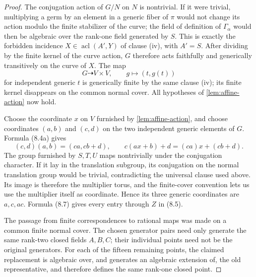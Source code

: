 \documentclass[11pt,oneside]{article}
\theoremstyle{definition}
\theoremstyle{remark}
\newcommand{\acl}{\operatorname{acl}}
\begin{document}
\begin{proof}
The conjugation action of $G/N$ on $N$ is nontrivial.  If it were trivial, multiplying a
germ by an element in a generic fiber of $\pi$ would not change its action modulo the
finite stabilizer of the curve; the field of definition of $\Gamma_\alpha$ would then be
algebraic over the rank-one field generated by $S$.  This is exactly the forbidden
incidence $X\in\acl(A',Y)$ of clause (iv), with $A'=S$.  After dividing by the finite
kernel of the curve action, $G$ therefore acts faithfully and generically transitively on
the curve of $X$.  The map
\[
 G\dashrightarrow V\times V,\qquad g\longmapsto(t,g(t))
\]
for independent generic $t$ is generically finite by the same clause (iv); its finite
kernel disappears on the common normal cover.  All hypotheses of
\cref{lem:affine-action} now hold.

Choose the coordinate $x$ on $V$ furnished by \cref{lem:affine-action}, and choose
coordinates $(a,b)$ and $(c,d)$ on the two independent generic elements of $G$.  Formula
(8.4a) gives
\[
 (c,d)(a,b)=(ca,cb+d),\qquad c(ax+b)+d=(ca)x+(cb+d).             \tag{8.7}
\]
The group furnished by $S,T,U$ maps nontrivially under the conjugation character.  If it
lay in the translation subgroup, its conjugation on the normal translation group would
be trivial, contradicting the universal clause used above.  Its image is therefore the
multiplier torus, and the finite-cover convention lets us use the multiplier itself as
coordinate.  Hence its three generic coordinates are $a,c,ac$.  Formula (8.7) gives
every entry through $Z$ in (8.5).

The passage from finite correspondences to rational maps was made on a common finite
normal cover.  The chosen generator pairs need only generate the same rank-two
closed fields $A,B,C$; their individual points need not be the original generators.
For each of the fifteen remaining points, the claimed replacement is algebraic over,
and generates an algebraic extension of, the old representative, and therefore defines
the same rank-one closed point.


\end{proof}
\end{document}

